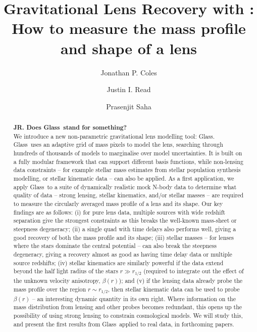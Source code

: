 \documentclass[galley]{mn2e}
\title[\Glass]{Gravitational Lens Recovery with \Glass: How to measure the mass profile and shape of a lens}
\author{%
Jonathan P. Coles 
\and 
Justin I. Read
\and 
Prasenjit Saha 
}
\newcommand{\Glass}{{\sc Glass}}
\begin{document}
\maketitle

\begin{abstract}
{\bf JR. Does \Glass\ stand for something?}\\
We introduce a new non-parametric gravitational lens modelling tool: \Glass. \Glass\ uses an adaptive grid of mass pixels to model the lens, searching through hundreds of thousands of models to marginalise over model uncertainties. It is built on a fully modular framework that can support different basis functions, while non-lensing data constraints -- for example stellar mass estimates from stellar population synthesis modelling, or stellar kinematic data -- can also be applied. As a first application, we apply \Glass\ to a suite of dynamically realistic mock N-body data to determine what quality of data -- strong lensing, stellar kinematics, and/or stellar masses -- are required to measure the circularly averaged mass profile of a lens and its shape. Our key findings are as follows: (i) for pure lens data, multiple sources with wide redshift separation give the strongest constraints as this breaks the well-known mass-sheet or steepness degeneracy; (ii) a single quad with time delays also performs well, giving a good recovery of both the mass profile and its shape; (iii) stellar masses -- for lenses where the stars dominate the central potential -- can also break the steepness degeneracy, giving a recovery almost as good as having time delay data or multiple source redshifts; (iv) stellar kinematics are similarly powerful if the data extend beyond the half light radius of the stars $r \gg r_{1/2}$ (required to integrate out the effect of the unknown velocity anisotropy, $\beta(r)$); and (v) if the lensing data already probe the mass profile over the region $r \sim r_{1/2}$, then stellar kinematic data can be used to probe $\beta(r)$ -- an interesting dynamic quantity in its own right. Where information on the mass distribution from lensing and other probes becomes redundant, this opens up the possibility of using strong lensing to constrain cosmological models. We will study this, and present the first results from \Glass\ applied to real data, in forthcoming papers.
\end{abstract}

\end{document}
